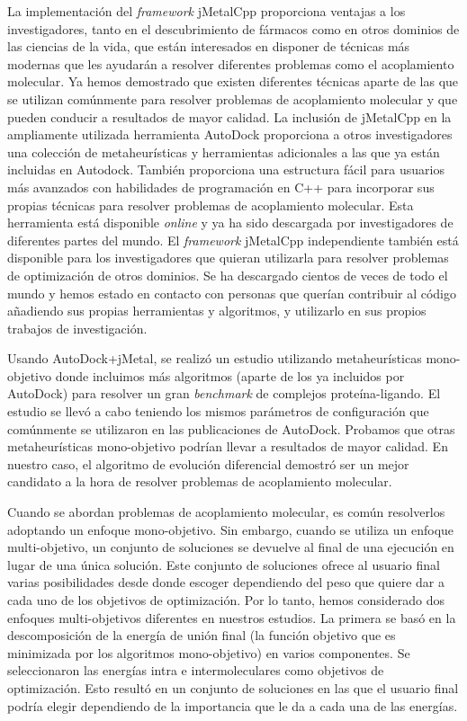 La implementación del \emph{framework} jMetalCpp proporciona ventajas a los investigadores, tanto en el descubrimiento de fármacos como en otros dominios de las ciencias de la vida, que están interesados en disponer de técnicas más modernas que les ayudarán a resolver diferentes problemas como el acoplamiento molecular. Ya hemos demostrado que existen diferentes técnicas aparte de las que se utilizan comúnmente para resolver problemas de acoplamiento molecular y que pueden conducir a resultados de mayor calidad. La inclusión de jMetalCpp en la ampliamente utilizada herramienta AutoDock proporciona a otros investigadores una colección de metaheurísticas y herramientas adicionales a las que ya están incluidas en Autodock. También proporciona una estructura fácil para usuarios más avanzados con habilidades de programación en C++ para incorporar sus propias técnicas para resolver problemas de acoplamiento molecular. Esta herramienta está disponible \emph{online} y ya ha sido descargada por investigadores de diferentes partes del mundo. El \emph{framework} jMetalCpp independiente también está disponible para los investigadores que quieran utilizarla para resolver problemas de optimización de otros dominios. Se ha descargado cientos de veces de todo el mundo y hemos estado en contacto con personas que querían contribuir al código añadiendo sus propias herramientas y algoritmos, y utilizarlo en sus propios trabajos de investigación.

Usando AutoDock+jMetal, se realizó un estudio utilizando metaheurísticas mono-objetivo donde incluimos más algoritmos (aparte de los ya incluidos por AutoDock) para resolver un gran \emph{benchmark} de complejos proteína-ligando. El estudio se llevó a cabo teniendo los mismos parámetros de configuración que comúnmente se utilizaron en las publicaciones de AutoDock. Probamos que otras metaheurísticas mono-objetivo podrían llevar a resultados de mayor calidad. En nuestro caso, el algoritmo de evolución diferencial demostró ser un mejor candidato a la hora de resolver problemas de acoplamiento molecular.

Cuando se abordan problemas de acoplamiento molecular, es común resolverlos adoptando un enfoque mono-objetivo. Sin embargo, cuando se utiliza un enfoque multi-objetivo, un conjunto de soluciones se devuelve al final de una ejecución en lugar de una única solución. Este conjunto de soluciones ofrece al usuario final varias posibilidades desde donde escoger dependiendo del peso que quiere dar a cada uno de los objetivos de optimización. Por lo tanto, hemos considerado dos enfoques multi-objetivos diferentes en nuestros estudios. La primera se basó en la descomposición de la energía de unión final (la función objetivo que es minimizada por los algoritmos mono-objetivo) en varios componentes. Se seleccionaron las energías intra e intermoleculares como objetivos de optimización. Esto resultó en un conjunto de soluciones en las que el usuario final podría elegir dependiendo de la importancia que le da a cada una de las energías.

